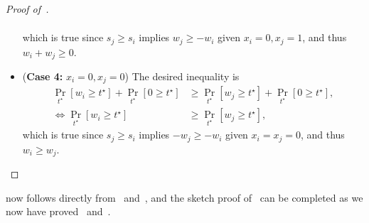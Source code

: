 \begin{proof}[Proof of~]
\begin{itemize}
\begin{align*}
        \end{align*}
        which is true since $s_j \geq s_i$ implies $w_j \geq -w_i$ given $x_i = 0, x_j = 1$, and thus $w_i + w_j \geq 0$.
        \item (\textbf{Case 4:} $x_i = 0, x_j = 0$) The desired inequality is
        \begin{align*}
            \Pr_{t^\star}[w_i \geq t^\star] + \Pr_{t^\star}[0 \geq t^\star] &\geq \Pr_{t^\star}[w_j \geq t^\star] + \Pr_{t^\star}[0 \geq t^\star],\\
            \iff \Pr_{t^\star}[w_i \geq t^\star] &\geq \Pr_{t^\star}[w_j \geq t^\star],
        \end{align*}
        which is true since $s_j \geq s_i$ implies $-w_j \geq -w_i$ given $x_i = x_j = 0$, and thus $w_i \geq w_j$.
    \end{itemize}
\end{proof}
 now follows directly from~ and~, and the sketch proof of~ can be completed as we now have proved~ and~.
